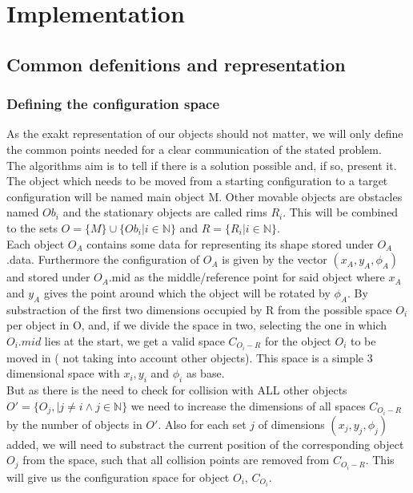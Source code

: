 \chapter{Implementation}
\label{cha:Implementation}
\section{Common defenitions and representation}
\subsection{Defining the configuration space}
As the exakt representation of our objects should not matter, we will only define the common points needed for a clear communication of the stated problem.\\
The algorithms aim is to tell if there is a solution possible and, if so, present it. The object which needs to be moved from a starting configuration to a target configuration will be named main object M. Other movable objects are obstacles named $Ob_i$  and the stationary objects are called rims $R_i$. This will be combined to the sets $O = \{M\}  \cup \{Ob_i | i \in \mathbb{N} \} $ and $ R = \{ R_i | i \in \mathbb{N}\}$.\\

Each object $O_A$ contains some data for representing its shape stored under $O_A$.data. Furthermore the configuration of $O_A$ is given by the vector $(x_A,y_A,\phi_A)$ and stored under $O_A$.mid as the middle/reference point for said object where $x_A$ and $y_A$ gives the point around which the object will be rotated by $\phi_A$.
By substraction of the first two dimensions occupied by R from the possible space $O_i$ per object in O, and, if we divide the space in two, selecting the one in which $O_i.mid$ lies at the start, we get a valid space $C_{O_i-R}$ for the object $O_i$ to be moved in ( not taking into account other objects). This space is a simple 3 dimensional space with $x_i, y_i$ and $\phi_i$ as base.\\
But as there is the need to check for collision with ALL other objects $O' = \{O_j, | j\neq i \wedge j \in \mathbb{N}\} $ we need to increase the dimensions of all spaces $C_{O_i-R}$ by the number of objects in $O'$. Also for each set $j$ of dimensions $(x_j,y_j,\phi_j)$  added, we will need to substract the current position of the corresponding object $O_j$ from the space, such that all collision points are removed from $C_{O_i-R}$. This will give us the configuration space for object $O_i$, $C_{O_i}$.


